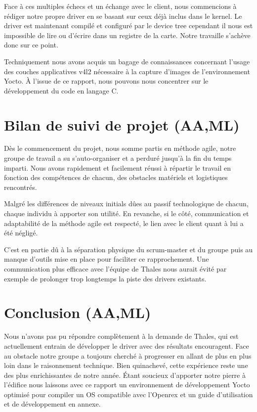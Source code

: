 Face à ces multiples échecs et un échange avec le client, nous commencions à rédiger
notre propre driver en se basant sur ceux déjà inclus dans le kernel. Le driver est
maintenant compilé et configuré par le device tree cependant il nous est impossible de lire
ou d’écrire dans un registre de la carte. Notre travaille s’achève donc sur ce point.\medskip

Techniquement nous avons acquis un bagage de connaissances concernant l’usage des
couches applicatives v4l2 nécessaire à la capture d’images de l’environnement Yocto. À
l’issue de ce rapport, nous pouvons nous concentrer sur le développement du code en
langage C.

\section{Bilan de suivi de projet (AA,ML)}

Dès le commencement du projet, nous somme partis en méthode agile, notre groupe de
travail a su s’auto-organiser et a perduré jusqu’à la fin du temps imparti. Nous avons
rapidement et facilement réussi à répartir le travail en fonction des compétences de
chacun, des obstacles matériels et logistiques rencontrés. \medskip

Malgré les différences de niveaux initials dûes au passif technologique de chacun, chaque individu
à apporter son utilité. En revanche, si le côté, communication et adaptabilité de la méthode agile
est respecté, le lien avec le client quant à lui a été négligé. \medskip

C’est en partie dû à la séparation physique du scrum-master et du groupe puis au manque d’outils
mise en place pour faciliter ce rapprochement. Une communication plus efficace avec l’équipe de
Thales nous aurait évité par exemple de prolonger trop longtemps la piste des drivers existants.

\section{Conclusion (AA,ML)}

Nous n’avons pas pu répondre complètement à la demande de Thales, qui est
actuellement entrain de développer le driver avec des résultats encouragent. Face au
obstacle notre groupe a toujours cherché à progresser en allant de plus en plus loin dans
le raisonnement technique. Bien quinachevé, cette expérience reste une des plus
enrichissantes de notre année. Étant soucieux d’apporter notre pierre à l’édifice nous
laissons avec ce rapport un environnement de développement Yocto optimisé pour
compiler un OS compatible avec l’Openrex et un guide d’utilisation et de développement
en annexe.